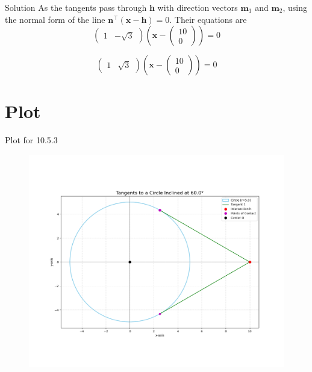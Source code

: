 \documentclass{beamer}
\let\vec\mathbf
\providecommand{\brak}[1]{\ensuremath{\left(#1\right)}}
\theoremstyle{remark}
\newcommand{\myvec}[1]{\ensuremath{\begin{pmatrix}#1\end{pmatrix}}}
\begin{document}
\begin{frame}{Solution}
    As the tangents pass through $\vec{h}$ with direction vectors $\vec{m}_1$ and $\vec{m}_2$, using the normal form of the line $\vec{n}^{\top}(\vec{x}-\vec{h}) = 0$.
Their equations are
\begin{equation}
    \myvec{1&-\sqrt{3}}\brak{\vec{x} - \myvec{10\\0}} = 0
\end{equation}

\begin{equation}
    \myvec{1&\sqrt{3}}\brak{\vec{x} - \myvec{10\\0}} = 0
\end{equation}
\end{frame}

\section{Plot}
\begin{frame}{Plot for 10.5.3}
\begin{figure}[H]
    \centering
    \includegraphics[width=0.65\columnwidth]{figs/1.png}
\end{figure}
\end{frame}
\end{document}
